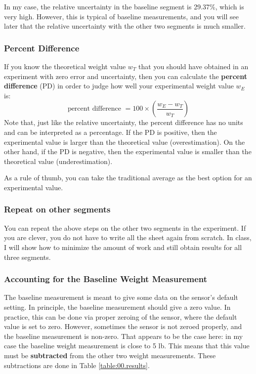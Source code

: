 In my case, the relative uncertainty in the baseline segment is 29.37\%, which is very high. However, this is typical of baseline measurements, and you will see later that the relative uncertainty with the other two segments is much smaller.
\subsubsection{Percent Difference}
If you know the theoretical weight value $w_{T}$ that you should have obtained in an experiment with zero error and uncertainty, then you can calculate the \textbf{percent difference} (PD) in order to judge how well your experimental weight value $w_{E}$ is:
\begin{equation}
    \text{percent difference } = 100 \times \left( \frac{w_{E} - w_{T}}{w_{T}} \right)
\end{equation}
Note that, just like the relative uncertainty, the percent difference has no units and can be interpreted as a percentage. If the PD is positive, then the experimental value is larger than the theoretical value (overestimation). On the other hand, if the PD is negative, then the experimental value is smaller than the theoretical value (underestimation).

As a rule of thumb, you can take the traditional average as the best option for an experimental value.
\subsubsection{Repeat on other segments}
You can repeat the above steps on the other two segments in the experiment. If you are clever, you do not have to write all the sheet again from scratch. In class, I will show how to minimize the amount of work and still obtain results for all three segments.
\subsubsection{Accounting for the Baseline Weight Measurement}
The baseline measurement is meant to give some data on the sensor's default setting. In principle, the baseline measurement should give a zero value. In practice, this can be done via proper zeroing of the sensor, where the default value is set to zero. However, sometimes the sensor is not zeroed properly, and the baseline measurement is non-zero. That appears to be the case here: in my case the baseline weight measurement is close to 5 lb. This means that this value must be \textbf{subtracted} from the other two weight measurements. These subtractions are done in Table \ref{table:00.results}.
